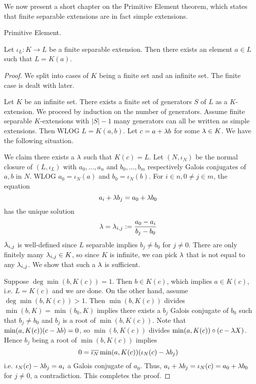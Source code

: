 \documentclass[../book.tex]{subfiles}
\begin{document}
We now present a short chapter on the Primitive Element theorem,
which states that finite separable extensions are in fact simple extensions.

\begin{thm} Primitive Element.
    
    Let $\iota_L : K \to L$ be a finite separable extension. 
    Then there exists an element $a \in L$ such that $L = K(a)$. 
\end{thm}
\begin{proof}
    We split into cases of $K$ being a finite set and an infinite set. 
    The finite case is dealt with later. 
    
    Let $K$ be an infinite set. 
    There exists a finite set of generators $S$ of $L$ as a $K$-extension.
    We proceed by induction on the number of generators. 
    Assume finite separable $K$-extensions with $|S|-1$ many generators 
    can all be written as simple extensions. 
    Then WLOG $L = K(a, b)$. 
    Let $c = a + \lambda b$ for some $\lambda \in K$. 
    We have the following situation. 
    \begin{figure}[H]
        \centering
    \end{figure}
    We claim there exists a $\lambda$ such that $K(c) = L$. 
    Let $(N,\iota_N)$ be the normal closure of $(L,\iota_L)$
    with $a_0,\dots,a_n$ and $b_0,\dots,b_m$ respectively Galois conjugates of $a, b$ in $N$.
    WLOG $a_0 = \iota_N(a)$ and $b_0 = \iota_N(b)$.
    For $i \in n, 0 \neq j \in m$, the equation \[
        a_i + \lambda b_j = a_0 + \lambda b_0
    \]
    has the unique solution \[
        \lambda = \lambda_{i,j} := \frac{a_0 - a_i}{b_j - b_0}
    \]
    $\lambda_{i,j}$ is well-defined since $L$ separable implies $b_j \neq b_0$ for $j\neq0$.
    There are only finitely many $\lambda_{i,j} \in K$, so since $K$ is infinite, 
    we can pick $\lambda$ that is not equal to any $\lambda_{i,j}$. 
    We show that such a $\lambda$ is sufficient.
    
    Suppose $\deg\min(b,K(c)) = 1$. 
    Then $b \in K(c)$, which implies $a \in K(c)$, i.e. $L = K(c)$ and we are done. 
    On the other hand, assume $\deg\min(b,K(c)) > 1$. 
    Then $\min(b,K(c))$ divides $\min(b,K) = \min(b_0,K)$ implies
    there exists a $b_j$ Galois conjugate of $b_0$ such that 
    $b_j \neq b_0$ and $b_j$ is a root of $\min(b,K(c))$. 
    Note that $\min(a,K(c)) (c - \lambda b) = 0$,
    so $\min(b,K(c))$ divides $\min(a,K(c)) \circ (c - \lambda X)$.
    Hence $b_j$ being a root of $\min(b,K(c))$ implies
    \[ 0 = \overline{\iota_N} \min(a,K(c)) (\iota_N(c) - \lambda b_j) \]
    i.e. $\iota_N(c) - \lambda b_j = a_i$ a Galois conjugate of $a_0$.
    Thus, $a_i + \lambda b_j = \iota_N(c) = a_0 + \lambda b_0$ for $j \neq 0$, a contradiction. 
    This completes the proof. 
    
\end{proof}
\end{document}
